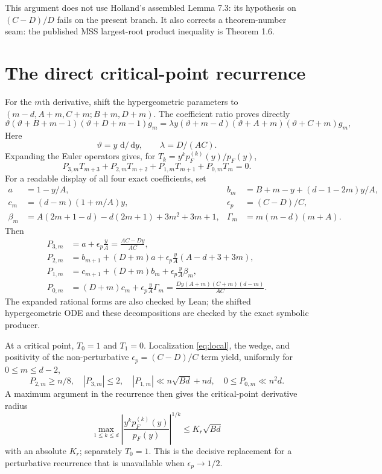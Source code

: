 \documentclass[11pt]{article}
\theoremstyle{definition}
\theoremstyle{remark}
\newcommand{\dd}{\,\mathrm d}
\begin{document}
This argument does not use Holland's assembled Lemma 7.3: its hypothesis on
$(C-D)/D$ fails on the present branch.  It also corrects a theorem-number
seam: the published MSS largest-root product inequality is Theorem 1.6.

\section{The direct critical-point recurrence}\label{sec:recurrence}

For the $m$th derivative, shift the hypergeometric parameters to
$(m-d,A+m,C+m;B+m,D+m)$.  The coefficient ratio proves directly
\[
 \vartheta(\vartheta+B+m-1)(\vartheta+D+m-1)g_m
 =\lambda y(\vartheta+m-d)(\vartheta+A+m)(\vartheta+C+m)g_m,
\]
Here
\[
 \vartheta=y\,\dd/\dd y,\qquad \lambda=D/(AC).
\]
Expanding the Euler operators gives, for
$T_k=y^kp_F^{(k)}(y)/p_F(y)$,
\[
 P_{3,m}T_{m+3}+P_{2,m}T_{m+2}
 +P_{1,m}T_{m+1}+P_{0,m}T_m=0.
\]
For a readable display of all four exact coefficients, set
\begin{align*}
 a&=1-y/A,&
 b_m&=B+m-y+(d-1-2m)y/A,\\
 c_m&=(d-m)(1+m/A)y,&
 \epsilon_p&=(C-D)/C,\\
 \beta_m&=A(2m+1-d)-d(2m+1)+3m^2+3m+1,&
 \Gamma_m&=m(m-d)(m+A).
\end{align*}
Then
\begin{align*}
 P_{3,m}&=a+\epsilon_p\frac yA=\frac{AC-Dy}{AC},\\
 P_{2,m}&=b_{m+1}+(D+m)a
   +\epsilon_p\frac yA(A-d+3+3m),\\
 P_{1,m}&=c_{m+1}+(D+m)b_m
   +\epsilon_p\frac yA\beta_m,\\
 P_{0,m}&=(D+m)c_m+\epsilon_p\frac yA\Gamma_m
   =\frac{Dy(A+m)(C+m)(d-m)}{AC}.
\end{align*}
The expanded rational forms are also checked by Lean; the shifted
hypergeometric ODE and these decompositions are checked by the exact
symbolic producer.

At a critical point, $T_0=1$ and $T_1=0$.  Localization
\eqref{eq:local}, the wedge, and positivity of the non-perturbative
$\epsilon_p=(C-D)/C$ term yield, uniformly for $0\le m\le d-2$,
\[
 P_{2,m}\ge n/8,\quad |P_{3,m}|\le2,\quad
 |P_{1,m}|\ll n\sqrt{Bd}+nd,\quad 0\le P_{0,m}\ll n^2d.
\]
A maximum argument in the recurrence then gives the critical-point
derivative radius
\begin{equation}\label{eq:radius}
 \max_{1\le k\le d}
 \left|\frac{y^kp_F^{(k)}(y)}{p_F(y)}\right|^{1/k}
 \le K_r\sqrt{Bd}
\end{equation}
with an absolute $K_r$; separately $T_0=1$.  This is the decisive replacement for a perturbative
recurrence that is unavailable when $\epsilon_p\to1/2$.
\end{document}
